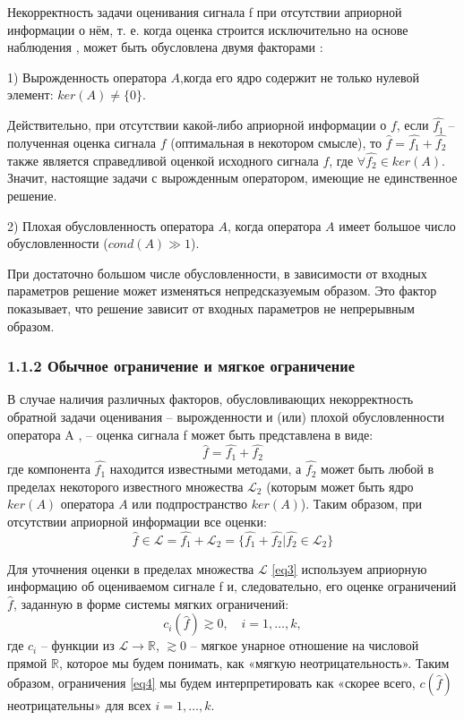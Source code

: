 \documentclass[12pt, a4paper, oneside]{article}
\begin{document}
				Некорректность задачи оценивания сигнала f при отсутствии априорной информации о нём, т. е. когда оценка строится исключительно на основе наблюдения , может быть обусловлена двумя факторами \cite{2}:
				
				1) Вырожденность оператора $A$,когда его ядро содержит не только нулевой элемент: $ker(A) \ne \{0\}$.
				
					Действительно, при отсутствии какой-либо априорной информации о $f$, если $\hat{f_1}$ -- полученная оценка сигнала $f$ (оптимальная в некотором смысле), то $\hat{f} = \hat{f_1} + \hat{f_2}$ также является справедливой оценкой исходного сигнала $f$, где $\forall \hat{f_2} \in ker(A)$. Значит, настоящие задачи с вырожденным оператором, имеющие не единственное решение.
				
				2) Плохая обусловленность оператора $A$, когда оператора $A$ имеет большое число обусловленности ($cond(A)\gg 1$).
				
					При достаточно большом числе обусловленности, в зависимости от входных параметров решение может изменяться непредсказуемым образом. Это фактор показывает, что решение зависит от входных параметров не непрерывным образом.
				
			\subsubsection{1.1.2 Обычное ограничение и мягкое ограничение}
				В случае наличия различных факторов, обусловливающих некорректность обратной задачи оценивания – вырожденности и (или) плохой обусловленности оператора A , – оценка сигнала f может быть представлена в виде:
				\begin{equation}
					\label{eq2}
					\hat{f} = \hat{f_1} + \hat{f_2}
				\end{equation}
				где компонента $\hat{f_1}$ находится известными методами, а $\hat{f_2}$ может быть любой в пределах некоторого известного множества $\mathcal{L}_2$ (которым может быть ядро $ker(A)$ оператора $A$ или подпространство $ker(A)$). Таким образом, при отсутствии априорной информации все оценки:
				\begin{equation}
					\label{eq3}
					\hat{f}\in \mathcal{L}=\hat{f_1}+\mathcal{L}_2=\{\hat{f_1}+\hat{f_2} | \hat{f_2}\in\mathcal{L}_2\}
				\end{equation}
			
				Для уточнения оценки в пределах множества $\mathcal{L}$ \eqref{eq3} используем априорную информацию об оцениваемом сигнале f и, следовательно, его оценке ограничений $\hat{f}$, заданную в форме системы мягких ограничений:
				\begin{equation}
					\label{eq4}
					c_i(\hat{f}) \gtrsim 0,\quad i = 1,\dots,k,
				\end{equation}
				где $c_i$ -- функции из $\mathcal{L}\to\mathbb{R}$, $\gtrsim 0$ -- мягкое унарное отношение на числовой прямой $\mathbb{R}$, которое мы будем понимать, как «мягкую неотрицательность». Таким образом, ограничения \eqref{eq4} мы будем интерпретировать как «скорее всего, $c(\hat{f})$ неотрицательны» для всех $i = 1,\dots,k$.\\
				
\end{document}
